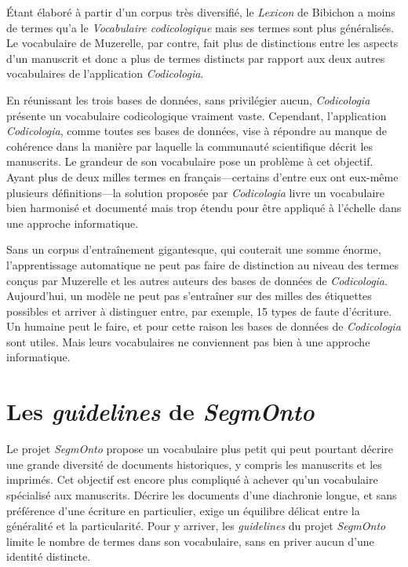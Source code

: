\documentclass[class=article, crop=false]{standalone}
\begin{document}
\noindent Étant élaboré à partir d'un corpus très diversifié, le \textit{Lexicon} de Bibichon a moins de termes qu'a le \textit{Vocabulaire codicologique} mais ses termes sont plus généralisés. Le vocabulaire de Muzerelle, par contre, fait plus de distinctions entre les aspects d'un manuscrit et donc a plus de termes distincts par rapport aux deux autres vocabulaires de l'application \textit{Codicologia}.

En réunissant les trois bases de données, sans privilégier aucun, \textit{Codicologia} présente un vocabulaire codicologique vraiment vaste. Cependant, l'application \textit{Codicologia}, comme toutes ses bases de données, vise à répondre au manque de cohérence dans la manière par laquelle la communauté scientifique décrit les manuscrits. Le grandeur de son vocabulaire pose un problème à cet objectif. Ayant plus de deux milles termes en français---certains d'entre eux ont eux-même plusieurs définitions---la solution proposée par \textit{Codicologia} livre un vocabulaire bien harmonisé et documenté mais trop étendu pour être appliqué à l'échelle dans une approche informatique.

Sans un corpus d'entraînement gigantesque, qui couterait une somme énorme, l'apprentissage automatique ne peut pas faire de distinction au niveau des termes conçus par Muzerelle et les autres auteurs des bases de données de \textit{Codicologia}. Aujourd'hui, un modèle ne peut pas s'entraîner sur des milles des étiquettes possibles et arriver à distinguer entre, par exemple, 15 types de faute d'écriture. Un humaine peut le faire, et pour cette raison les bases de données de \textit{Codicologia} sont utiles. Mais leurs vocabulaires ne conviennent pas bien à une approche informatique.  

\section{Les \textit{guidelines} de \textit{SegmOnto}}

Le projet \textit{SegmOnto} propose un vocabulaire plus petit qui peut pourtant décrire une grande diversité de documents historiques, y compris les manuscrits et les imprimés. Cet objectif est encore plus compliqué à achever qu'un vocabulaire spécialisé aux manuscrits. Décrire les documents d'une diachronie longue, et sans préférence d'une écriture en particulier, exige un équilibre délicat entre la généralité et la particularité. Pour y arriver, les \textit{guidelines} du projet \textit{SegmOnto} limite le nombre de termes dans son vocabulaire, sans en priver aucun d'une identité distincte.
\end{document}
